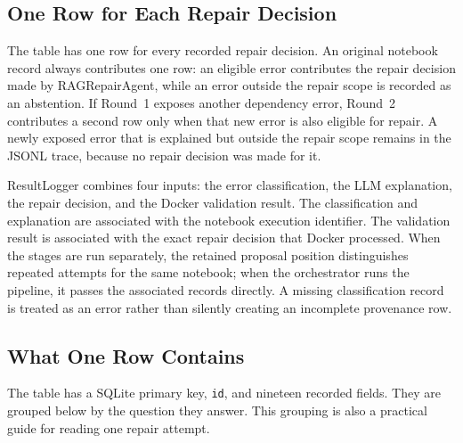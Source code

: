 \subsection{One Row for Each Repair Decision}
\label{sec:m-resultlogger-join}

The table has one row for every recorded repair decision. An original
notebook record always contributes one row: an eligible error contributes
the repair decision made by RAGRepairAgent, while an error outside the repair
scope is recorded as an abstention. If Round~1 exposes another dependency
error, Round~2 contributes a second row only when that new error is also
eligible for repair. A newly exposed error that is explained but outside the
repair scope remains in the JSONL trace, because no repair decision was made
for it.

ResultLogger combines four inputs: the error classification, the LLM
explanation, the repair decision, and the Docker validation result. The
classification and explanation are associated with the notebook execution
identifier. The validation result is associated with the exact repair
decision that Docker processed. When the stages are run separately, the
retained proposal position distinguishes repeated attempts for the same
notebook; when the orchestrator runs the pipeline, it passes the associated
records directly. A missing classification record is treated as an error
rather than silently creating an incomplete provenance row.

\subsection{What One Row Contains}
\label{sec:m-resultlogger-row}

The table has a SQLite primary key, \texttt{id}, and nineteen recorded
fields. They are grouped below by the question they answer. This grouping is
also a practical guide for reading one repair attempt.


